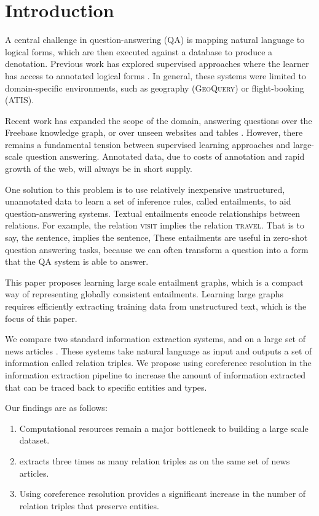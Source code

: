 \section{Introduction}


A central challenge in question-answering (QA) is mapping 
natural language to logical forms, which are then
executed against a database to produce a denotation. Previous work
has explored supervised approaches where the learner
has access to annotated logical forms \citep{zelle96geoquery,zettlemoyer05ccg,wong07synchronous,zettlemoyer09context,kwiatkowski10ccg}. In general,
these systems were limited to domain-specific environments, such as
geography (\textsc{GeoQuery}) or flight-booking (\textsc{ATIS}).

Recent work has expanded the scope of the domain, answering questions 
over the Freebase knowledge graph, or over unseen websites and tables
\citep{berant2013freebase,yao2014ie,pasupat2014extraction,pasupat2015compositional}. However, there remains a fundamental tension between supervised
learning approaches and large-scale question answering. Annotated
data, due to costs of annotation and rapid growth of the web, will
always be in short supply.

One solution to this problem is to use relatively inexpensive
unstructured, unannotated data to learn a set of inference
rules, called entailments, to aid question-answering systems.
Textual entailments encode relationships between relations. For 
example, the relation \textsc{visit} implies the relation \textsc{travel}.
That is to say, the sentence, 
implies the sentence,  These
entailments are useful in zero-shot question answering tasks, because
we can often transform a question into a form that
the QA system is able to answer.

This paper proposes learning large scale entailment graphs,
which is a compact way of representing globally consistent entailments.
Learning large graphs requires efficiently extracting training data
from unstructured text, which is the focus of this paper.

We compare two standard information extraction systems, 
\reverb{} and \openie{} on a large set of news articles \citep{angeli2015openie,fader11reverb}. These systems take natural language as input and outputs
a set of information called relation triples. 
We propose using coreference resolution in the
information extraction pipeline to
increase the amount of information extracted that can
be traced back to specific entities and types.

Our findings are as follows:
\begin{enumerate}
\item Computational resources remain a major bottleneck to building a large scale
  dataset.
\item \openie{} extracts three times as many relation triples as \reverb{} on the
  same set of news articles.
\item Using coreference resolution provides a significant increase in the
  number of relation triples that preserve entities.
\end{enumerate}

